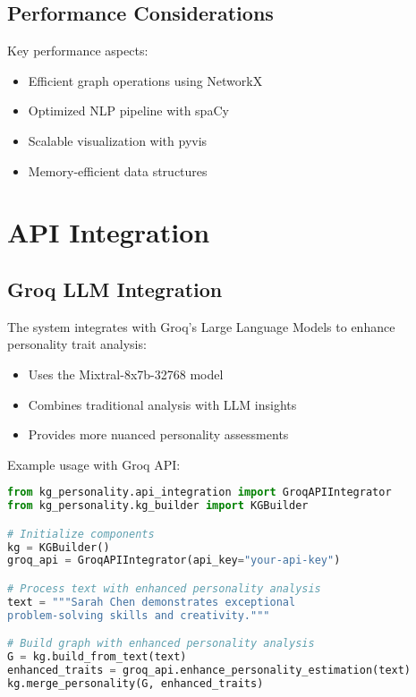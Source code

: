 \documentclass[11pt]{article}
\begin{document}
\subsection{Performance Considerations}
Key performance aspects:

\begin{itemize}
    \item Efficient graph operations using NetworkX
    \item Optimized NLP pipeline with spaCy
    \item Scalable visualization with pyvis
    \item Memory-efficient data structures
\end{itemize}

\section{API Integration}

\subsection{Groq LLM Integration}
The system integrates with Groq's Large Language Models to enhance personality trait analysis:

\begin{itemize}
    \item Uses the Mixtral-8x7b-32768 model
    \item Combines traditional analysis with LLM insights
    \item Provides more nuanced personality assessments
\end{itemize}

Example usage with Groq API:

\begin{lstlisting}[language=Python, caption=Groq API Integration Example]
from kg_personality.api_integration import GroqAPIIntegrator
from kg_personality.kg_builder import KGBuilder

# Initialize components
kg = KGBuilder()
groq_api = GroqAPIIntegrator(api_key="your-api-key")

# Process text with enhanced personality analysis
text = """Sarah Chen demonstrates exceptional 
problem-solving skills and creativity."""

# Build graph with enhanced personality analysis
G = kg.build_from_text(text)
enhanced_traits = groq_api.enhance_personality_estimation(text)
kg.merge_personality(G, enhanced_traits)
\end{lstlisting}
\end{document}
